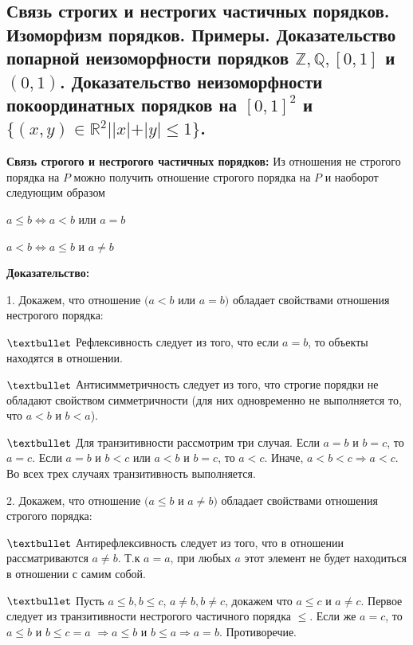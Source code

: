 \subsection{Связь строгих и нестрогих частичных порядков. Изоморфизм порядков. Примеры. Доказательство попарной неизоморфности порядков $\mathbb{Z}, \mathbb{Q}, [0, 1]$ и $(0, 1)$. Доказательство неизоморфности покоординатных порядков на $[0, 1]^2$ и $\{(x, y) \in \mathbb{R}^2 | |x| + |y| \le 1\}$.}

\textbf{Связь строгого и нестрогого частичных порядков:} Из отношения не строгого порядка на $P$ можно получить отношение строгого порядка на $P$ и наоборот следующим образом

\begin{center}
    $a \le b \Leftrightarrow a < b$ или $a = b$

    $a < b \Leftrightarrow a \le b$ и $a \neq b$
\end{center}

\textbf{Доказательство:}

1. Докажем, что отношение $(a < b$ или $a = b)$ обладает свойствами отношения нестрогого порядка:

\hspace{0.5cm}\parbox{15cm}{
    $\textbullet$ Рефлексивность следует из того, что если $a = b$, то объекты находятся в отношении. 

    $\textbullet$ Антисимметричность следует из того, что строгие порядки не обладают свойством симметричности (для них одновременно не выполняется то, что $a < b$ и $b < a$).

    $\textbullet$ Для транзитивности рассмотрим три случая. Если $a = b$ и $b = c$, то $a = c$. Если $a = b$ и $b < c$ или $a < b$ и $b = c$, то $a < c$. Иначе, $a < b < c \Rightarrow a < c$. Во всех трех случаях транзитивность выполняется.
}

2. Докажем, что отношение $(a \le b$ и $a \neq b)$ обладает свойствами отношения строгого порядка:

\hspace{0.5cm}\parbox{15cm}{
    $\textbullet$ Антирефлексивность следует из того, что в отношении рассматриваются $a \neq b$. Т.к $a = a$, при любых $a$ этот элемент не будет находиться в отношении с самим собой.

    $\textbullet$ Пусть $a \le b, b \le c$, $a \neq b, b \neq c$, докажем что $a \le c$ и $a \neq c$. Первое следует из транзитивности нестрогого частичного порядка $\le$. Если же $a = c$, то $a \le b$ и $b \le c = a$ $\Rightarrow a \le b$ и $b \le a \Rightarrow a = b$. Противоречие.
}


